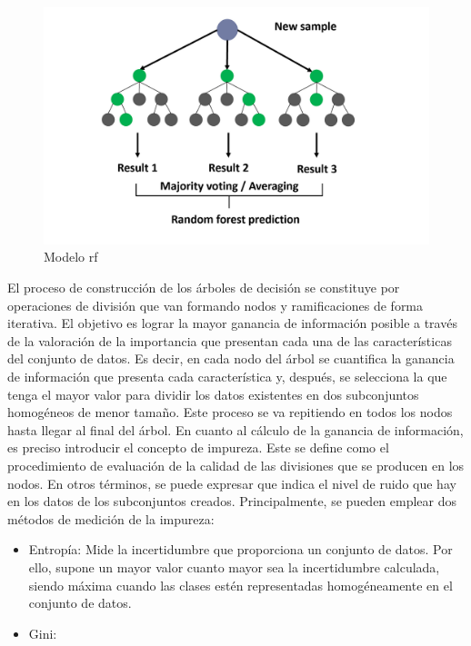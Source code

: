 \vspace{3mm}

\begin{figure}[h!]
    \centering
    \includegraphics[width=1\textwidth]{img/teoria/rf.png}
    \caption{Modelo \acrshort{rf} \cite{rfmedium}}
    \label{fig:rf}
\end{figure}

\vspace{3mm}

El proceso de construcción de los árboles de decisión se constituye por operaciones de división que van formando nodos y ramificaciones de forma iterativa. El objetivo es lograr la mayor ganancia de información posible a través de la valoración de la importancia que presentan cada una de las características del conjunto de datos. Es decir, en cada nodo del árbol se cuantifica la ganancia de información que presenta cada característica y, después, se selecciona la que tenga el mayor valor para dividir los datos existentes en dos subconjuntos homogéneos de menor tamaño. Este proceso se va repitiendo en todos los nodos hasta llegar al final del árbol. En cuanto al cálculo de la ganancia de información, es preciso introducir el concepto de impureza. Este se define como el procedimiento de evaluación de la calidad de las divisiones que se producen en los nodos. En otros términos, se puede expresar que indica el nivel de ruido que hay en los datos de los subconjuntos creados. Principalmente, se pueden emplear dos métodos de medición de la impureza: \cite{rfmedium2}

\begin{itemize}
    \item Entropía: Mide la incertidumbre que proporciona un conjunto de datos. Por ello, supone un mayor valor cuanto mayor sea la incertidumbre calculada, siendo máxima cuando las clases estén representadas homogéneamente en el conjunto de datos. 
    \item Gini:
\end{itemize}

